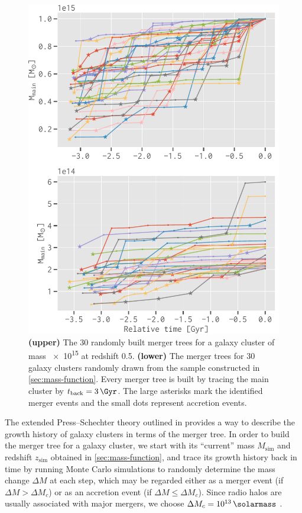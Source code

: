 \documentclass[twocolumn]{aastex62}
\newcommand{\R}[1]{\mathrm{#1}}
\newcommand{\editone}[1]{{\leavevmode\color{cyan}#1}}
\begin{document}
\begin{figure}
  \centering
  \includegraphics[width=\columnwidth]{merging-history}
  \caption{\label{fig:merging-history}\editone{%
    \textbf{(upper)} The 30 randomly built merger trees for a galaxy cluster
    of mass \SI{e15}{\solarmass} at redshift 0.5.
    \textbf{(lower)} The merger trees for 30 galaxy clusters randomly drawn
    from the sample constructed in \autoref{sec:mass-function}.
    Every merger tree is built by tracing the main cluster by
    $t_{\R{back}} = \SI{3}{\Gyr}$.
    The large asterisks mark the identified merger events and the small
    dots represent accretion events.
  }}
\end{figure}

The extended Press--Schechter theory outlined in \citet{lacey1993} provides
a way to describe the growth history of galaxy clusters in terms of the
merger tree.
In order to build the merger tree for a galaxy cluster, we start with
its \enquote{current} mass $M_{\R{sim}}$ and redshift $z_{\R{sim}}$ obtained
in \autoref{sec:mass-function}, and trace its growth history back in time
by running Monte Carlo simulations to randomly determine the mass change
$\Delta M$ at each step, which may be regarded either as a merger event
(if $\Delta M > \Delta M_c$) or as an accretion event
(if $\Delta M \leq \Delta M_c$).
Since radio halos are usually associated with major mergers, we choose
$\Delta M_c = \SI{e13}{\solarmass}$ \citep[e.g.,][]{cassano2005}.
\end{document}
